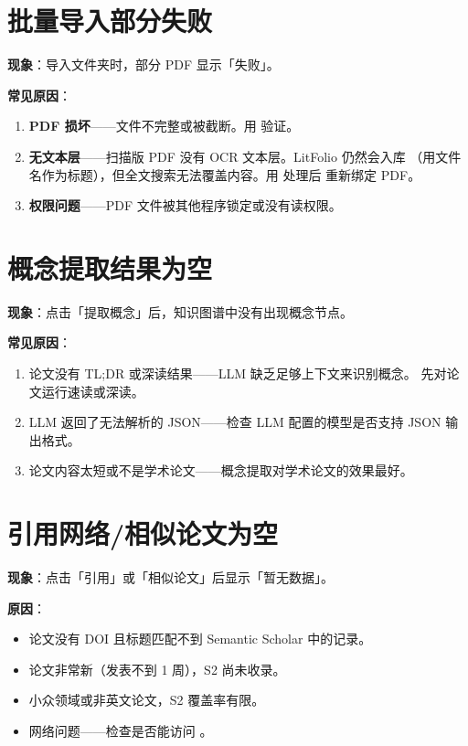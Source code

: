 \section{批量导入部分失败}

\textbf{现象}：导入文件夹时，部分 PDF 显示「失败」。

\textbf{常见原因}：

\begin{enumerate}
  \item \textbf{PDF 损坏}——文件不完整或被截断。用  验证。
  \item \textbf{无文本层}——扫描版 PDF 没有 OCR 文本层。LitFolio 仍然会入库
    （用文件名作为标题），但全文搜索无法覆盖内容。用  处理后
    重新绑定 PDF。
  \item \textbf{权限问题}——PDF 文件被其他程序锁定或没有读权限。
\end{enumerate}

\section{概念提取结果为空}

\textbf{现象}：点击「提取概念」后，知识图谱中没有出现概念节点。

\textbf{常见原因}：

\begin{enumerate}
  \item 论文没有 TL;DR 或深读结果——LLM 缺乏足够上下文来识别概念。
    先对论文运行速读或深读。
  \item LLM 返回了无法解析的 JSON——检查 LLM 配置的模型是否支持 JSON
    输出格式。
  \item 论文内容太短或不是学术论文——概念提取对学术论文的效果最好。
\end{enumerate}

\section{引用网络/相似论文为空}

\textbf{现象}：点击「引用」或「相似论文」后显示「暂无数据」。

\textbf{原因}：

\begin{itemize}
  \item 论文没有 DOI 且标题匹配不到 Semantic Scholar 中的记录。
  \item 论文非常新（发表不到 1 周），S2 尚未收录。
  \item 小众领域或非英文论文，S2 覆盖率有限。
  \item 网络问题——检查是否能访问 。
\end{itemize}

